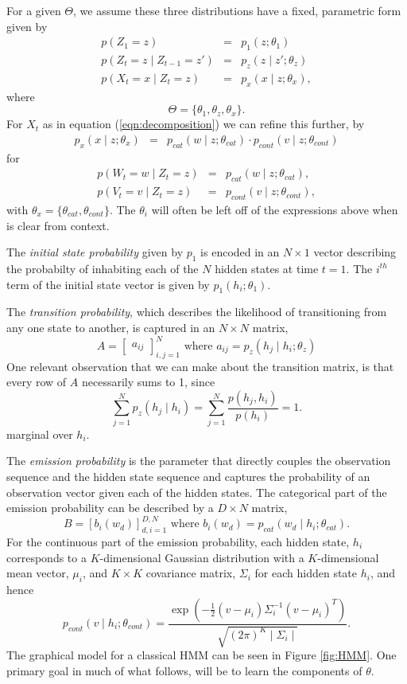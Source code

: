 \documentclass{amsart}
\begin{document}
For a given $\Theta$, we assume 
these three distributions have a fixed, parametric form given by 
\begin{eqnarray*}
p(Z_1=z) &=& p_1(z;\theta_1)\\
p(Z_t = z\mid Z_{t-1}=z') & = & p_z(z\mid z';\theta_z)\\
p(X_t=x\mid Z_t=z) & = &p_x(x\mid z;\theta_x),
\end{eqnarray*} 
where 
\[
\Theta = \{\theta_1,\theta_z,\theta_x\}.
\]
For $X_t$ as in equation (\ref{eqn:decomposition}) we can refine this further, 
by
\begin{eqnarray*}
p_x(x\mid z;\theta_x)& = &p_{cat}(w\mid z; \theta_{cat})\cdot p_{cont}(v\mid z; \theta_{cont})
\end{eqnarray*}
for
\begin{eqnarray*}
p(W_t=w\mid Z_t=z) & = & p_{cat}(w\mid z; \theta_{cat}),\\
p(V_t=v\mid Z_t=z) & = & p_{cont}(v\mid z; \theta_{cont}),
\end{eqnarray*}
with $\theta_x = \{\theta_{cat},\theta_{cont}\}$.
The $\theta_i$ will often be left off of the expressions above when is clear 
from context. 

The {\em initial state probability} given by $p_1$ is encoded in an $N\times 1$ 
vector describing the probabilty of inhabiting each of the $N$ hidden states at 
time $t=1$.  The $i^{th}$ term of the initial state vector is given by  
$p_1(h_i; \theta_1)$. 

The {\em transition probability}, which describes the 
likelihood of transitioning from any one state to another, is captured in an 
$N\times N$ matrix, 
\[
A=\begin{bmatrix}
a_{ij}
\end{bmatrix}_{i,j=1}^N \text{ where }a_{ij} = p_z(h_j\mid h_i;\theta_z)
\]
One relevant observation that we can make about the transition matrix, is that 
every row of $A$ necessarily sums to 1, since 
\[
\sum_{j=1}^Np_z(h_j\mid h_i)=\sum_{j=1}^N\frac{p(h_j,h_i)}{p(h_i)}=1.
\]
marginal over $h_i$.

The {\em emission probability} is the parameter that directly 
couples the observation sequence and the hidden 
state sequence and captures the probability of an observation vector given each 
of the hidden states. The categorical part of the emission probability can be 
described by a $D\times N$ matrix, 
\[
B = \left[b_{i}(w_d)\right]_{d,i=1}^{D,N}\text{ where }b_{i}(w_d) =p_{cat}(w_d\mid h_i; \theta_{cat}).
\]
For the continuous part of the emission probability, each hidden state, $h_i$ 
corresponds to a $K$-dimensional Gaussian distribution with a 
$K$-dimensional mean vector, $\mu_i$, 
and $K\times K$ covariance matrix, $\Sigma_i$ for each hidden state $h_i$, and 
hence 
\[
p_{cont}(v\mid 
h_i;\theta_{cont})=\frac{\exp\left(-\frac{1}{2}\left(v-\mu_i\right)\Sigma_i^{-1}\left(v-\mu_i\right)^T\right)}{\sqrt{(2\pi)^K\mid \Sigma_i\mid}}.
\]
The graphical model for a classical HMM can 
be seen in Figure \ref{fig:HMM}.  One primary goal in much of what follows, will be to learn the components of 
$\theta$.
\end{document}
